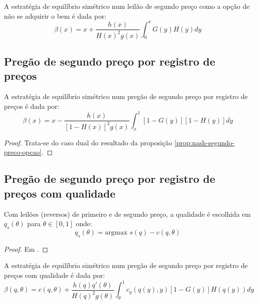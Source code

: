 \begin{proposicao}
	\label{prop:nash-segundo-preco-opcao}
	A estratégia de equilíbrio simétrico num leilão de segundo preço como a opção de não se adquirir o bem é dada por:
	\begin{equation}
		\beta(x) = x + \frac{h(x)}{H(x)^2 g(x)} \int_0^x G(y)H(y)dy
	\end{equation}
\end{proposicao}

\subsection{Pregão de segundo preço por registro de preços}

\begin{proposicao}
	\label{prop:nash-pregao-segundo-preco-rp}
	A estratégia de equilíbrio simétrico num pregão de segundo preço por registro de preços é dada por:
	\begin{equation}
		\beta(x) = x - \frac{h(x)}{[1-H(x)]^2 g(x)} \int_x^1 [1-G(y)][1-H(y)]dy
	\end{equation}
\end{proposicao}
\begin{proof}
	Trata-se do caso dual do resultado da proposição \ref{prop:nash-segundo-preco-opcao}.
\end{proof}

\subsection{Pregão de segundo preço por registro de preços com qualidade}

\begin{lema}
	Com leilões (reversos) de primeiro e de segundo preço, a qualidade é escolhida em $q_s(\theta)$ para $\theta \in [0, 1]$ onde:
	\begin{equation}
		q_s(\theta) = \text{argmax } s(q) - c(q, \theta)
	\end{equation}
	\begin{proof}
		Em \citet{Che1993}.
	\end{proof}
\end{lema}

\begin{proposicao}
	\label{prop:nash-pregao-segundo-preco-qualidade}
	A estratégia de equilíbrio simétrico num pregão de segundo preço por registro de preços com qualidade é dada por:
	\begin{equation}
		\beta(q, \theta) = c(q, \theta) + \frac{h(q)q'(\theta)}{H(q)^2g(\theta)}\int_{\theta}^1 c_{y}(q(y), y)[1-G(y)]H(q(y))dy
	\end{equation}
\end{proposicao}